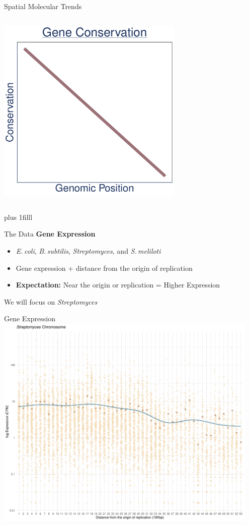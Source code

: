 \documentclass{beamer}
\makeatletter
\newcommand{\bi}{\begin{itemize}}
\newcommand{\ei}{\end{itemize}}
\newcommand{\sourceright}[1]{\begin{textblock*}{}
		\begin{beamercolorbox}[ht=0.5cm,left]{framesource}
			\usebeamerfont{framesource}\usebeamercolor[berry]{framesource}
			{#1}
		\end{beamercolorbox}
	\end{textblock*}}
\newcommand{\itm}{\item<itm@1->}
\newcommand{\btVFill}{\vskip0pt plus 1filll}
\newcommand{\smel}{\textit{S.\,meliloti}\xspace}
\newcommand{\bass}{\textit{B.\,subtilis}\xspace}
\newcommand{\strep}{\textit{Streptomyces}\xspace}
\newcommand{\ecol}{\textit{E.\,coli}\xspace}
\makeatother
\begin{document}
\begin{frame}{Spatial Molecular Trends}
\begin{columns}[t]
		\includegraphics[width=0.67\textwidth]{./cons_graph.pdf}
	\end{columns}
	
	\btVFill
	\tiny \vspace{-\baselineskip}\color{berry}{Couturier et al. 2006, Cooper et al. 2010, Sharp et al. 2005, Morrow et al. 2012, Cooper and Rocha 2006}
	
\end{frame}
\begin{frame}[t]{The Data}
	\textbf{Gene Expression}
	\bi
	\itm \ecol, \bass, \strep, and \smel
	\itm Gene expression + distance from the origin of replication
	\itm \textbf{Expectation:} Near the origin or replication = Higher Expression
	\ei
	
	\bigskip
	
	We will focus on \strep
	
\end{frame}
\begin{frame}{Gene Expression}
	\centering
	\includegraphics[width=0.95\textwidth]{strep_expression_plot.pdf}
\end{frame}
\end{document}
